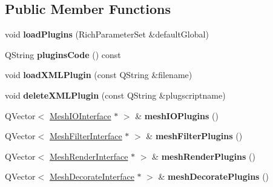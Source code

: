 \subsection*{Public Member Functions}
\begin{DoxyCompactItemize}
\item 
\mbox{\label{class_plugin_manager_ab47612dbe014efce267e591d0ccdbad7}} 
void {\bfseries load\+Plugins} (Rich\+Parameter\+Set \&default\+Global)
\item 
\mbox{\label{class_plugin_manager_acb8104500d85f8c32c0022a9b0764b71}} 
Q\+String {\bfseries plugins\+Code} () const
\item 
\mbox{\label{class_plugin_manager_a7b8688f0918c01f05cd495143eb5ca9e}} 
void {\bfseries load\+X\+M\+L\+Plugin} (const Q\+String \&filename)
\item 
\mbox{\label{class_plugin_manager_aacfdae39c33ce9ed74eec4e74dba6cf9}} 
void {\bfseries delete\+X\+M\+L\+Plugin} (const Q\+String \&plugscriptname)
\item 
\mbox{\label{class_plugin_manager_a94d5fbe77ac71d55741082ec88ef77b6}} 
Q\+Vector$<$ \hyperlink{class_mesh_i_o_interface}{Mesh\+I\+O\+Interface} $\ast$ $>$ \& {\bfseries mesh\+I\+O\+Plugins} ()
\item 
\mbox{\label{class_plugin_manager_aed64ea3ec39296ff016ce73894ef488c}} 
Q\+Vector$<$ \hyperlink{class_mesh_filter_interface}{Mesh\+Filter\+Interface} $\ast$ $>$ \& {\bfseries mesh\+Filter\+Plugins} ()
\item 
\mbox{\label{class_plugin_manager_a9006960c6c19909fd4613f089dfc0cbe}} 
Q\+Vector$<$ \hyperlink{class_mesh_render_interface}{Mesh\+Render\+Interface} $\ast$ $>$ \& {\bfseries mesh\+Render\+Plugins} ()
\item 
\mbox{\label{class_plugin_manager_ad4c833947150dc71ab4fcdbf337417bf}} 
Q\+Vector$<$ \hyperlink{class_mesh_decorate_interface}{Mesh\+Decorate\+Interface} $\ast$ $>$ \& {\bfseries mesh\+Decorate\+Plugins} ()
\item 
\mbox{\label{class_plugin_manager_a281e0708713e4cc10eb88424e72cd806}} 

\end{DoxyCompactItemize}
